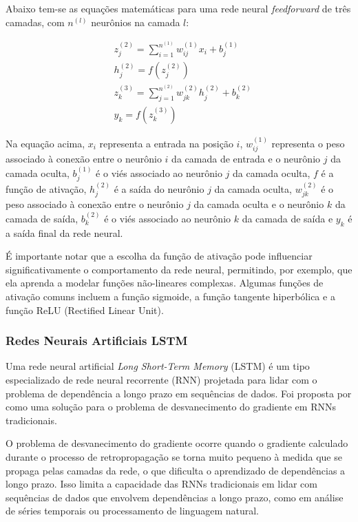 Abaixo tem-se as equações matemáticas para uma rede neural \textit{feedforward} de três camadas, com $n^{(l)}$ neurônios na camada $l$:

\begin{equation}
    \begin{aligned}
         & z_j^{(2)} = \sum\limits_{i=1}^{n^{(1)}} w_{ij}^{(1)} x_i + b_j^{(1)}       \\
         & h_j^{(2)} = f(z_j^{(2)})                                                   \\
         & z_k^{(3)} = \sum\limits_{j=1}^{n^{(2)}} w_{jk}^{(2)} h_j^{(2)} + b_k^{(2)} \\
         & y_k = f(z_k^{(3)})
    \end{aligned}
\end{equation}

Na equação acima, $x_i$ representa a entrada na posição $i$, $w_{ij}^{(1)}$ representa o peso associado à conexão entre o neurônio $i$ da camada de entrada e o neurônio $j$ da camada oculta, $b_j^{(1)}$ é o viés associado ao neurônio $j$ da camada oculta, $f$ é a função de ativação, $h_j^{(2)}$ é a saída do neurônio $j$ da camada oculta, $w_{jk}^{(2)}$ é o peso associado à conexão entre o neurônio $j$ da camada oculta e o neurônio $k$ da camada de saída, $b_k^{(2)}$ é o viés associado ao neurônio $k$ da camada de saída e $y_k$ é a saída final da rede neural.

É importante notar que a escolha da função de ativação pode influenciar significativamente o comportamento da rede neural, permitindo, por exemplo, que ela aprenda a modelar funções não-lineares complexas. Algumas funções de ativação comuns incluem a função sigmoide, a função tangente hiperbólica e a função ReLU (Rectified Linear Unit).

\subsubsection{Redes Neurais Artificiais LSTM }



Uma rede neural artificial \textit{Long Short-Term Memory} (LSTM) é um tipo especializado de rede neural recorrente (RNN) projetada para lidar com o problema de dependência a longo prazo em sequências de dados. Foi proposta por \cite{hochreiter1997long} como uma solução para o problema de desvanecimento do gradiente em RNNs tradicionais.

O problema de desvanecimento do gradiente ocorre quando o gradiente calculado durante o processo de retropropagação se torna muito pequeno à medida que se propaga pelas camadas da rede, o que dificulta o aprendizado de dependências a longo prazo. Isso limita a capacidade das RNNs tradicionais em lidar com sequências de dados que envolvem dependências a longo prazo, como em análise de séries temporais ou processamento de linguagem natural.

